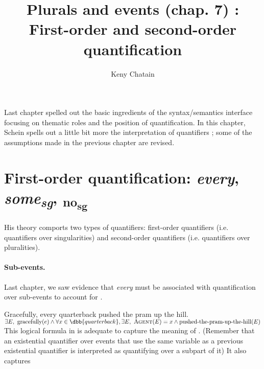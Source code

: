



\endofdump

\newcommand{\scale}{1}

\title{Plurals and events (chap. 7) : First-order and second-order quantification}
\author{Keny Chatain}


\maketitle

Last chapter spelled out the basic ingredients of the syntax/semantics interface focusing on thematic roles and the position of quantification. In this chapter, Schein spells out a little bit more the interpretation of quantifiers ; some of the assumptions made in the previous chapter are revised.


\section{First-order quantification: \emph{every}, \emph{some\textsubscript{sg}}, \textsubscript{no\textsubscript{sg}}}
%
His theory comports two types of quantifiers: first-order quantifiers (i.e. quantifiers over singularities) and second-order quantifiers (i.e. quantifiers over pluralities). 

\paragraph{Sub-events.} Last chapter, we saw evidence that \emph{every} must be associated with quantification over sub-events to account for \cnextxa.

\pex
\a
Gracefully, every quarterback pushed the pram up the hill.
\a
$\exists E,\ \text{gracefully}(e) \wedge \forall x\in\dbb{quarterback}, \exists E,\ \textsc{Agent}(E) = x \wedge \text{pushed-the-pram-up-the-hill}(E)$ 
\xe
%
This logical formula in \clastxb is adequate to capture the meaning of \clastxa. (Remember that an existential quantifier over events that use the same variable as a previous existential quantifier is interpreted as quantifying over a subpart of it) It also captures

